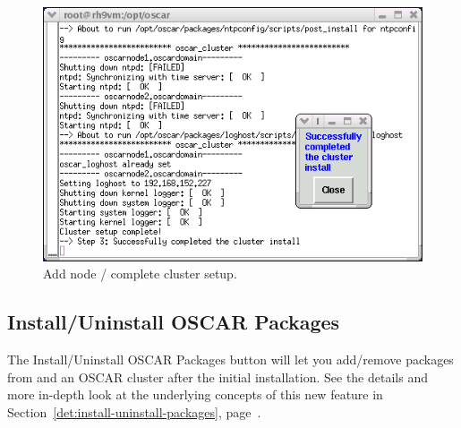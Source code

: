 \begin{figure}[!b]
  \begin{center}
    \centerline{\includegraphics[scale=\imgscale]{figs/9f_sbs-add-node-complete}}
    \caption{Add node / complete cluster setup.}
    \label{fig:sbs-add-node1-cluster-setup}
  \end{center}
\end{figure}


\subsection{Install/Uninstall OSCAR Packages}

The Install/Uninstall OSCAR Packages button will let you add/remove packages from
and an OSCAR cluster after the initial installation.  See the details and more
in-depth look at the underlying concepts of this new feature in
Section~\ref{det:install-uninstall-packages}, page~\pageref{det:install-uninstall-packages}.

